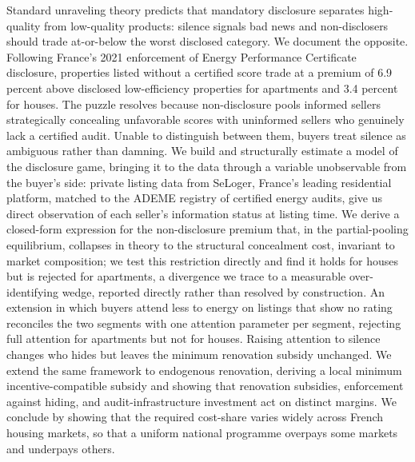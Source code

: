 Standard unraveling theory predicts that mandatory disclosure separates high-quality from low-quality products: silence signals bad news and non-disclosers should trade at-or-below the worst disclosed category. We document the opposite. Following France's 2021 enforcement of Energy Performance Certificate disclosure, properties listed without a certified score trade at a premium of 6.9 percent above disclosed low-efficiency properties for apartments and 3.4 percent for houses. The puzzle resolves because non-disclosure pools informed sellers strategically concealing unfavorable scores with uninformed sellers who genuinely lack a certified audit. Unable to distinguish between them, buyers treat silence as ambiguous rather than damning. We build and structurally estimate a model of the disclosure game, bringing it to the data through a variable unobservable from the buyer's side: private listing data from SeLoger, France's leading residential platform, matched to the ADEME registry of certified energy audits, give us direct observation of each seller's information status at listing time. We derive a closed-form expression for the non-disclosure premium that, in the partial-pooling equilibrium, collapses in theory to the structural concealment cost, invariant to market composition; we test this restriction directly and find it holds for houses but is rejected for apartments, a divergence we trace to a measurable over-identifying wedge, reported directly rather than resolved by construction. An extension in which buyers attend less to energy on listings that show no rating reconciles the two segments with one attention parameter per segment, rejecting full attention for apartments but not for houses. Raising attention to silence changes who hides but leaves the minimum renovation subsidy unchanged. %
 We extend the same framework to endogenous renovation, deriving a local minimum incentive-compatible subsidy and showing that renovation subsidies, enforcement against hiding, and audit-infrastructure investment act on distinct margins. We conclude by showing that the required cost-share varies widely across French housing markets, so that a uniform national programme overpays some markets and underpays others.

